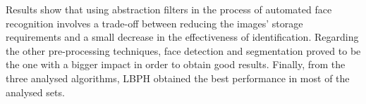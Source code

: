 Results show that using abstraction filters in the process of automated face recognition involves a trade-off between reducing the images' storage requirements and a small decrease in the effectiveness of identification. Regarding the other pre-processing techniques, face detection and segmentation proved to be the one with a bigger impact in order to obtain good results. Finally, from the three analysed algorithms, LBPH obtained the best performance in most of the analysed sets. 